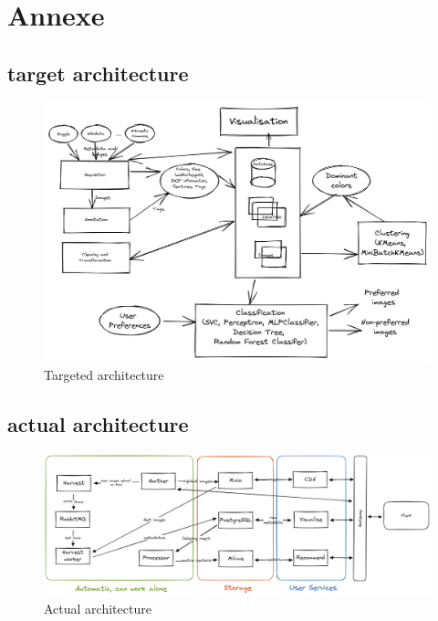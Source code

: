 \documentclass{article}
\begin{document}
    \newpage
    \appendix


    \section{Annexe}\label{sec:annexe}

    \subsection{target architecture}\label{subsec:target_architecture}

    \begin{figure}[htbp]
        \centering
        \includegraphics[width=0.8 \textwidth]{targeted_archi}
        \caption{Targeted architecture}
        \label{fig:targeted_architecture}
    \end{figure}

    \subsection{actual architecture}\label{subsec:actual_architecture}

    \begin{figure}[htbp]
        \centering
        \includegraphics[width=1.2\textwidth]{actual_architecture}
        \caption{Actual architecture}
        \label{fig:actual_architecture}
    \end{figure}
\end{document}
